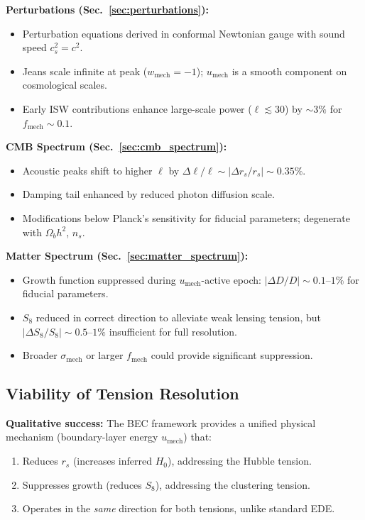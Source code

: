 \documentclass[11pt,a4paper]{article}
\newcommand{\umech}{\ensuremath{u_{\mathrm{mech}}}}
\newcommand{\wmech}{\ensuremath{w_{\mathrm{mech}}}}
\newcommand{\fmech}{\ensuremath{f_{\mathrm{mech}}}}
\newcommand{\sigmamech}{\ensuremath{\sigma_{\mathrm{mech}}}}
\newcommand{\rs}{\ensuremath{r_s}}
\newcommand{\Omb}{\ensuremath{\Omega_b}}
\theoremstyle{definition}
\theoremstyle{remark}
\begin{document}
\textbf{Perturbations (Sec.~\ref{sec:perturbations}):}
\begin{itemize}[leftmargin=*, itemsep=0.2em]
\item Perturbation equations derived in conformal Newtonian gauge with sound speed $c_s^2 = c^2$.
\item Jeans scale infinite at peak ($\wmech = -1$); $\umech$ is a smooth component on cosmological scales.
\item Early ISW contributions enhance large-scale power ($\ell \lesssim 30$) by $\sim 3\%$ for $\fmech \sim 0.1$.
\end{itemize}

\textbf{CMB Spectrum (Sec.~\ref{sec:cmb_spectrum}):}
\begin{itemize}[leftmargin=*, itemsep=0.2em]
\item Acoustic peaks shift to higher $\ell$ by $\Delta\ell/\ell \sim |\Delta\rs/\rs| \sim 0.35\%$.
\item Damping tail enhanced by reduced photon diffusion scale.
\item Modifications below Planck's sensitivity for fiducial parameters; degenerate with $\Omb h^2$, $n_s$.
\end{itemize}

\textbf{Matter Spectrum (Sec.~\ref{sec:matter_spectrum}):}
\begin{itemize}[leftmargin=*, itemsep=0.2em]
\item Growth function suppressed during $\umech$-active epoch: $|\Delta D/D| \sim 0.1$--$1\%$ for fiducial parameters.
\item $S_8$ reduced in correct direction to alleviate weak lensing tension, but $|\Delta S_8/S_8| \sim 0.5$--$1\%$ insufficient for full resolution.
\item Broader $\sigmamech$ or larger $\fmech$ could provide significant suppression.
\end{itemize}

\subsection{Viability of Tension Resolution}
\label{sec:viability}

\textbf{Qualitative success:} The BEC framework provides a unified physical mechanism (boundary-layer energy $\umech$) that:
\begin{enumerate}[leftmargin=*, itemsep=0.2em]
\item Reduces $\rs$ (increases inferred $H_0$), addressing the Hubble tension.
\item Suppresses growth (reduces $S_8$), addressing the clustering tension.
\item Operates in the \emph{same} direction for both tensions, unlike standard EDE.
\end{enumerate}
\end{document}
